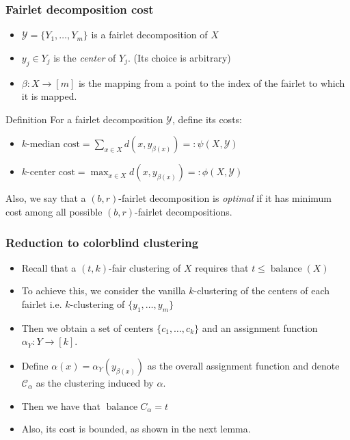\documentclass{beamer}
\DeclareMathOperator{\balance}{balance}
\begin{document}
\begin{frame}
\frametitle{Fairlet decomposition cost}

\begin{itemize}
	\item $\mathcal{Y} = \{ Y_1, \dots, Y_m \}$ is a fairlet decomposition of $X$
	\item $y_j \in Y_j$ is the {\it center} of $Y_j$. (Its choice is arbitrary)
	\item $\beta : X \rightarrow [m]$ is the mapping from a point to the index of the fairlet to which it is mapped.
\end{itemize}

\begin{block}{Definition}
For a fairlet decomposition $\mathcal{Y}$, define its costs:

\begin{itemize}
	\item $k \text{-median cost} = \sum_{x \in X} d \left(x, y_{\beta(x)}\right) =: \psi(X, \mathcal{Y})$
	\item $k \text{-center cost} = \max_{x \in X} d \left(x, y_{\beta(x)}\right) =: \phi(X, \mathcal{Y})$
\end{itemize}

Also, we say that a $(b, r)$-fairlet decomposition is {\it optimal} if it has minimum cost among all possible $(b, r)$-fairlet decompositions.
\end{block}

\end{frame}



\begin{frame}
\frametitle{Reduction to colorblind clustering}

\begin{itemize}
	\item Recall that a $(t, k)$-fair clustering of $X$ requires that $t \leq \balance(X)$ \pause
	
	\item To achieve this, we consider the vanilla $k$-clustering of the \alert{centers of each fairlet} i.e. $k$-clustering of $\{y_1, \dots, y_m\}$ \pause
	
	\item Then we obtain a set of centers $\{c_1, \dots, c_k\}$ and an assignment function $\alpha_Y : Y \rightarrow [k]$. \pause
	
	\item Define $\alpha(x) = \alpha_Y(y_{\beta(x)})$ as the overall assignment function and denote $\mathcal{C}_\alpha$ as the clustering induced by $\alpha$. \pause
	
	\item Then we have that $\balance{C_\alpha} = t$ \pause
	
	\item Also, its cost is bounded, as shown in the next lemma.
\end{itemize}

\end{frame}
\end{document}

